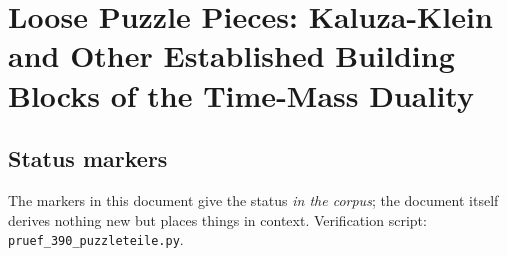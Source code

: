 
\providecommand{\BM}{\textbf{[B]}}
\providecommand{\KM}{\textbf{[K]}}
\providecommand{\SM}{\textbf{[S]}}
\providecommand{\XM}{\textbf{[X]}}
\providecommand{\QM}{\textbf{[Q]}}
\providecommand{\EM}{\textbf{[E]}}
\providecommand{\SetzM}{\textbf{[SETZUNG]}}

\chapter*{Loose Puzzle Pieces: Kaluza-Klein and Other Established Building Blocks of the Time-Mass Duality}

\begin{abstract}
Anyone who sees $\tilde T\cdot m=1$ for the first time often recognises something familiar in it,
most often Kaluza-Klein. That is not an objection but a finding: almost every building block of
FFGFT has been in the literature for decades, scattered, however, across relativity, quantum
mechanics, group theory, string theory, number theory and phenomenology. This document places
eleven such building blocks: Kaluza-Klein, de Broglie's internal clock and the Compton time, the
Zitterbewegung, Pauli's objection to a time operator, the relational approaches to time, Wigner's
mass as a Casimir invariant, the Casimir value of $SU(3)$, Heaviside-Lorentz units, orbifold
compactification, finite fields with their Frobenius automorphism, and the Koide formula. For each
building block it records what it already contained, which piece was missing, and where in the
corpus it fits in. The order matters: these building blocks were not the foundation of FFGFT. The
theory arose independently of them from the relation $\tilde T\cdot m=1$; the building blocks were
found in the literature only afterwards and fit into a picture that was drawn without them. The
result is a map of the places at which the theory could already have been found.
\end{abstract}

\section*{Status markers}

The markers in this document give the status \emph{in the corpus}; the document itself derives
nothing new but places things in context. Verification script: \texttt{pruef\_390\_puzzleteile.py}.

